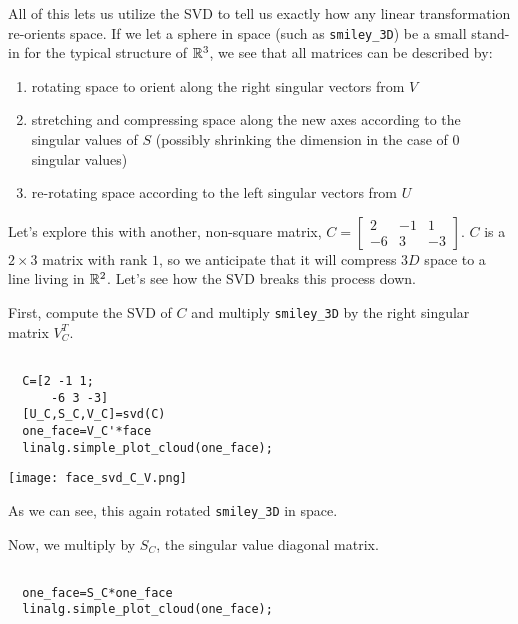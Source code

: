 \documentclass{ximera}
\begin{document}
\begin{problem}
\begin{problem}
All of this lets us utilize the SVD to tell us exactly how any linear transformation re-orients space. If we let a sphere in space (such as \texttt{smiley\_3D}) be a small stand-in for the typical structure of $\mathbb{R}^3$, we see that all matrices can be described by:

\begin{enumerate}

  \item rotating space to orient along the right singular vectors from $V$
  \item stretching and compressing space along the new axes according to the singular values of $S$ (possibly shrinking the dimension in the case of $0$ singular values)
  \item re-rotating space according to the left singular vectors from $U$

\end{enumerate}

Let's explore this with another, non-square matrix, $C=\begin{bmatrix}
  2 & -1 & 1\\
  -6 & 3 & -3
\end{bmatrix}$. $C$ is a $2\times 3$ matrix with rank $1$, so we anticipate that it will compress $3D$ space to a line living in $\mathbb{R}^2$. Let's see how the SVD breaks this process down.

First, compute the SVD of $C$ and multiply \texttt{smiley_3D} by the right singular matrix $V_C^T$.

\begin{verbatim}

  C=[2 -1 1;
      -6 3 -3]
  [U_C,S_C,V_C]=svd(C)
  one_face=V_C'*face
  linalg.simple_plot_cloud(one_face);

\end{verbatim}

\begin{center}
  \texttt{[image: face\_svd\_C\_V.png]}
\end{center}

As we can see, this again rotated \texttt{smiley\_3D} in space.

Now, we multiply by $S_C$, the singular value diagonal matrix.

\begin{verbatim}

  one_face=S_C*one_face
  linalg.simple_plot_cloud(one_face);

\end{verbatim}


\end{problem}
\end{problem}
\end{document}
